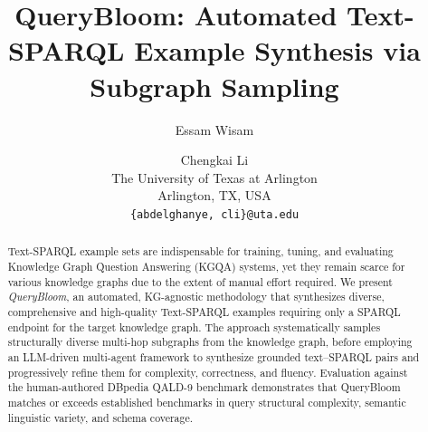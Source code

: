 \documentclass[11pt]{article}
\title{QueryBloom: Automated Text-SPARQL Example Synthesis via Subgraph Sampling}
\author{Essam Wisam \and Chengkai Li \\
  The University of Texas at Arlington \\
  Arlington, TX, USA \\
  \texttt{\{abdelghanye, cli\}@uta.edu}}
\begin{document}
\maketitle

\begin{abstract}
Text-SPARQL example sets are indispensable for training, tuning, and evaluating Knowledge Graph Question Answering (KGQA) systems, yet they remain scarce for various knowledge graphs due to the extent of manual effort required. We present \textit{QueryBloom}, an automated, KG-agnostic methodology that synthesizes diverse, comprehensive and high-quality Text-SPARQL examples requiring only a SPARQL endpoint for the target knowledge graph. The approach systematically samples structurally diverse multi-hop subgraphs from the knowledge graph, before employing an LLM-driven multi-agent framework to synthesize grounded text--SPARQL pairs and progressively refine them for complexity, correctness, and fluency. Evaluation against the human-authored DBpedia QALD-9 benchmark demonstrates that QueryBloom matches or exceeds established benchmarks in query structural complexity, semantic linguistic variety, and schema coverage.
\end{abstract}







\clearpage


\onecolumn
\appendix

\end{document}

